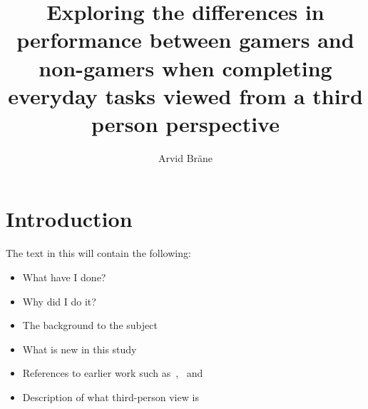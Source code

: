 \documentclass[runningheads,a4paper,oribibl]{llncs}
\begin{document}
\pagestyle{headings}

\mainmatter

\title{Exploring the differences in performance between gamers and non-gamers when completing everyday tasks viewed from a third person perspective}



\author{Arvid Bräne}


\maketitle






\section{Introduction}
The text in this will contain the following:
\begin{itemize}
	\item What have I done?
	\item Why did I do it?
	\item The background to the subject
	\item What is new in this study
	\item References to earlier work such as~\cite{schmierbach2011exploring},~\cite{salamin2006benefits} and~\cite{nakamura20103pi}
	\item Description of what third-person view is
\end{itemize}
\end{document}
